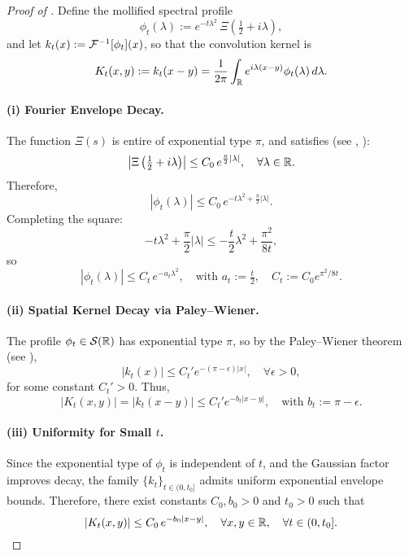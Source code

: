 \begin{proof}[Proof of ]
Define the mollified spectral profile
\[
\phi_t(\lambda) := e^{-t\lambda^2} \, \Xi\left(\tfrac{1}{2} + i\lambda\right),
\]
and let \( k_t(x) := \mathcal{F}^{-1}[\phi_t](x) \), so that the convolution kernel is
\[
K_t(x,y) := k_t(x - y) = \frac{1}{2\pi} \int_{\mathbb{R}} e^{i\lambda(x - y)} \phi_t(\lambda)\, d\lambda.
\]

\paragraph{(i) Fourier Envelope Decay.}
The function \( \Xi(s) \) is entire of exponential type \( \pi \), and satisfies (see \cite[Thm.~3.7.1]{Levin1996EntireLectures}, \cite[§4.12]{Titchmarsh1986Zeta}):
\[
\left| \Xi\left( \tfrac{1}{2} + i\lambda \right) \right| \le C_0\, e^{\frac{\pi}{2} |\lambda|}, \quad \forall \lambda \in \mathbb{R}.
\]
Therefore,
\[
|\phi_t(\lambda)| \le C_0\, e^{-t\lambda^2 + \frac{\pi}{2}|\lambda|}.
\]
Completing the square:
\[
-t\lambda^2 + \frac{\pi}{2}|\lambda| \le -\frac{t}{2} \lambda^2 + \frac{\pi^2}{8t},
\]
so
\[
|\phi_t(\lambda)| \le C_t\, e^{-a_t \lambda^2}, \quad \text{with } a_t := \tfrac{t}{2}, \quad C_t := C_0 e^{\pi^2/8t}.
\]

\paragraph{(ii) Spatial Kernel Decay via Paley--Wiener.}
The profile \( \phi_t \in \mathcal{S}(\mathbb{R}) \) has exponential type \( \pi \), so by the Paley--Wiener theorem (see \cite[Ch.~IX.4]{ReedSimon1975II}),
\[
|k_t(x)| \le C_t' e^{-(\pi - \epsilon)|x|}, \quad \forall \epsilon > 0,
\]
for some constant \( C_t' > 0 \). Thus,
\[
|K_t(x,y)| = |k_t(x - y)| \le C_t' e^{-b_t |x - y|}, \quad \text{with } b_t := \pi - \epsilon.
\]

\paragraph{(iii) Uniformity for Small \( t \).}
Since the exponential type of \( \phi_t \) is independent of \( t \), and the Gaussian factor improves decay, the family \( \{k_t\}_{t \in (0, t_0]} \) admits uniform exponential envelope bounds. Therefore, there exist constants \( C_0, b_0 > 0 \) and \( t_0 > 0 \) such that
\[
|K_t(x,y)| \le C_0\, e^{-b_0 |x - y|}, \quad \forall x, y \in \mathbb{R}, \quad \forall t \in (0, t_0].
\]


\end{proof}
